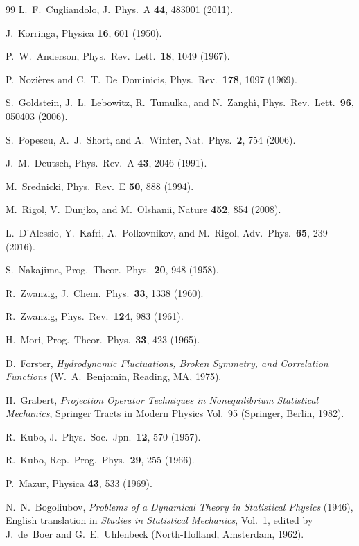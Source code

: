 \documentclass[10pt,a4paper]{article}
\begin{document}
\begin{thebibliography}{99}
L.~F.~Cugliandolo, J.~Phys.\ A \textbf{44}, 483001 (2011).

J.~Korringa, Physica \textbf{16}, 601 (1950).

P.~W.~Anderson, Phys.\ Rev.\ Lett.\ \textbf{18}, 1049 (1967).

P.~Nozi\`eres and C.~T.~De~Dominicis, Phys.\ Rev.\ \textbf{178}, 1097 (1969).

S.~Goldstein, J.~L.~Lebowitz, R.~Tumulka, and N.~Zangh\`i, Phys.\ Rev.\ Lett.\ \textbf{96}, 050403 (2006).

S.~Popescu, A.~J.~Short, and A.~Winter, Nat.\ Phys.\ \textbf{2}, 754 (2006).

J.~M.~Deutsch, Phys.\ Rev.\ A \textbf{43}, 2046 (1991).

M.~Srednicki, Phys.\ Rev.\ E \textbf{50}, 888 (1994).

M.~Rigol, V.~Dunjko, and M.~Olshanii, Nature \textbf{452}, 854 (2008).

L.~D'Alessio, Y.~Kafri, A.~Polkovnikov, and M.~Rigol, Adv.\ Phys.\ \textbf{65}, 239 (2016).

S.~Nakajima, Prog.\ Theor.\ Phys.\ \textbf{20}, 948 (1958).

R.~Zwanzig, J.~Chem.\ Phys.\ \textbf{33}, 1338 (1960).

R.~Zwanzig, Phys.\ Rev.\ \textbf{124}, 983 (1961).

H.~Mori, Prog.\ Theor.\ Phys.\ \textbf{33}, 423 (1965).

D.~Forster, \textit{Hydrodynamic Fluctuations, Broken Symmetry, and Correlation Functions} (W.~A.~Benjamin, Reading, MA, 1975).

H.~Grabert, \textit{Projection Operator Techniques in Nonequilibrium Statistical Mechanics}, Springer Tracts in Modern Physics Vol.~95 (Springer, Berlin, 1982).

R.~Kubo, J.~Phys.\ Soc.\ Jpn.\ \textbf{12}, 570 (1957).

R.~Kubo, Rep.\ Prog.\ Phys.\ \textbf{29}, 255 (1966).

P.~Mazur, Physica \textbf{43}, 533 (1969).

N.~N.~Bogoliubov, \textit{Problems of a Dynamical Theory in Statistical Physics} (1946), English translation in \textit{Studies in Statistical Mechanics}, Vol.~1, edited by J.~de~Boer and G.~E.~Uhlenbeck (North-Holland, Amsterdam, 1962).


\end{thebibliography}
\end{document}
